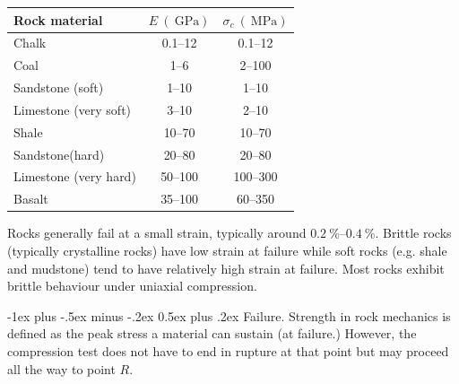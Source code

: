 \documentclass[10pt,landscape,a4paper]{article}
\makeatletter
\renewcommand{\section}{\@startsection{section}{1}{0mm}%
	{-1ex plus -.5ex minus -.2ex}%
	{0.5ex plus .2ex}%
	{\normalfont\large\bfseries}}
\makeatother
\begin{document}
\begin{multicols}{3}
\begin{figure}[H]
			\end{figure}
			\begin{table}[H]\scriptsize\centering\begin{tabular}{l c c}
				Rock material & $E \ (\SI{}{\giga\pascal})$ & $\sigma_c \ (\SI{}{\mega\pascal})$\\
				\hline
				Chalk & \SIrange{0.1}{12}{} & \SIrange{0.1}{12}{}\\
				Coal & \SIrange{1}{6}{} & \SIrange{2}{100}{}\\
				Sandstone (soft) & \SIrange{1}{10}{} & \SIrange{1}{10}{}\\
				Limestone (very soft) & \SIrange{3}{10}{} & \SIrange{2}{10}{}\\
				Shale & \SIrange{10}{70}{} & \SIrange{10}{70}{}\\
				Sandstone(hard) & \SIrange{20}{80}{} & \SIrange{20}{80}{}\\
				Limestone (very hard) & \SIrange{50}{100}{} & \SIrange{100}{300}{}\\
				Basalt & \SIrange{35}{100}{} & \SIrange{60}{350}{}
			\end{tabular}\end{table}
		Rocks generally fail at a small strain, typically around $\SIrange{0.2}{0.4}{\percent}$.
		Brittle rocks (typically crystalline rocks) have low strain at failure while soft rocks (e.g. shale and mudstone) tend to have relatively high strain at failure.
		Most rocks exhibit brittle behaviour under uniaxial compression.
		
		\section{Failure.}
		Strength in rock mechanics is defined as the peak stress a material can sustain (at failure.)
		However, the compression test does not have to end in rupture at that point but may proceed all the way to point $R$.
		

\end{multicols}
\end{document}
